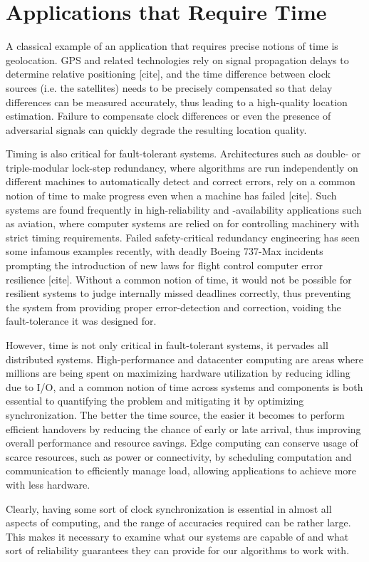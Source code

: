 
\section{Applications that Require Time}
A classical example of an application that requires precise notions of time is geolocation. GPS and related technologies rely on signal propagation delays to determine relative positioning [cite], and the time difference between clock sources (i.e. the satellites) needs to be precisely compensated so that delay differences can be measured accurately, thus leading to a high-quality location estimation. Failure to compensate clock differences or even the presence of adversarial signals can quickly degrade the resulting location quality.

Timing is also critical for fault-tolerant systems. Architectures such as double- or triple-modular lock-step redundancy, where algorithms are run independently on different machines to automatically detect and correct errors, rely on a common notion of time to make progress even when a machine has failed [cite]. Such systems are found frequently in high-reliability and -availability applications such as aviation, where computer systems are relied on for controlling machinery with strict timing requirements. Failed safety-critical redundancy engineering has seen some infamous examples recently, with deadly Boeing 737-Max incidents prompting the introduction of new laws for flight control computer error resilience [cite]. Without a common notion of time, it would not be possible for resilient systems to judge internally missed deadlines correctly, thus preventing the system from providing proper error-detection and correction, voiding the fault-tolerance it was designed for.

However, time is not only critical in fault-tolerant systems, it pervades all distributed systems. High-performance and datacenter computing are areas where millions are being spent on maximizing hardware utilization by reducing idling due to I/O, and a common notion of time across systems and components is both essential to quantifying the problem and mitigating it by optimizing synchronization. The better the time source, the easier it becomes to perform efficient handovers by reducing the chance of early or late arrival, thus improving overall performance and resource savings.
Edge computing can conserve usage of scarce resources, such as power or connectivity, by scheduling computation and communication to efficiently manage load, allowing applications to achieve more with less hardware.

Clearly, having some sort of clock synchronization is essential in almost all aspects of computing, and the range of accuracies required can be rather large. This makes it necessary to examine what our systems are capable of and what sort of reliability guarantees they can provide for our algorithms to work with.

